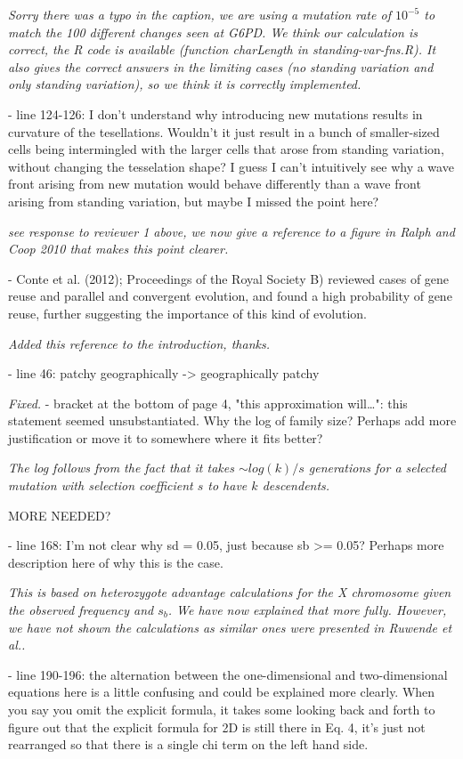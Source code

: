 \documentclass[12pt,letterpaper]{article}
\newcommand{\gc}[1]{{ \color{red} #1}}
\newcommand{\response}[1]{\emph{ \color{blue} #1}}
\begin{document}
\response{Sorry there was a typo in the caption, we are using a mutation rate of $10^{-5}$ to match the 100 different changes seen at G6PD. We think our calculation is correct, the R code is available (function charLength in standing-var-fns.R). It also gives the correct answers in the limiting cases (no standing variation and only standing variation), so we think it is correctly implemented.}


- line 124-126: I don't understand why introducing new mutations results in curvature of the tesellations. Wouldn't it just result in a bunch of smaller-sized cells being intermingled with the larger cells that arose from standing variation, without changing the tesselation shape? I guess I can't intuitively see why a wave front arising from new mutation would behave differently than a wave front arising from standing variation, but maybe I missed the point here?

\response{see response to reviewer 1 above, we now give a reference to a figure in Ralph and Coop 2010 that makes this point clearer.}

- Conte et al. (2012); Proceedings of the Royal Society B) reviewed cases of gene reuse and parallel and convergent evolution, and found a high probability of gene reuse, further suggesting the importance of this kind of evolution.

\response{Added this reference to the introduction, thanks.}

- line 46: patchy geographically -> geographically patchy

\response{Fixed.}
- bracket at the bottom of page 4, "this approximation will…": this statement seemed unsubstantiated. Why the log of family size? Perhaps add more justification or move it to somewhere where it fits better?

\response{The log follows from the fact that it takes $\sim log(k)/s$ generations for a selected mutation with selection coefficient $s$ to have $k$ descendents.}

\gc{MORE NEEDED?}

- line 168: I'm not clear why sd = 0.05, just because sb >= 0.05? Perhaps more description here of why this is the case.

\response{This is based on heterozygote advantage calculations for the X chromosome given the observed frequency and $s_b$. We have now explained that more fully. However, we have not shown the calculations as similar ones were presented in Ruwende et al..}

- line 190-196: the alternation between the one-dimensional and two-dimensional equations here is a little confusing and could be explained more clearly. When you say you omit the explicit formula, it takes some looking back and forth to figure out that the explicit formula for 2D is still there in Eq. 4, it's just not rearranged so that there is a single chi term on the left hand side.
\end{document}
